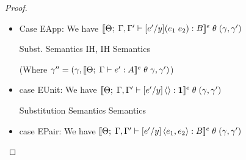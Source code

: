 \begin{proof}
\begin{itemize}
\begin{eqnproof}
          {IH}
          {Semantics}
  \end{eqnproof}

\item Case EApp: We have 
   $[\![{{\Theta};\;{\Gamma, \Gamma'} \vdash {[e'/y](e_1\;e_2)} : {B}}]\!]^e\;\theta\;
       (\gamma, \gamma')$

  \begin{eqnproof}
          {Subst.}
          {Semantics}
           {IH, IH}
           {Semantics}
  \end{eqnproof}

  (Where $\gamma'' = (\gamma, [\![{{\Theta};\;{\Gamma} \vdash {e'} : {A}}]\!]^e\;\theta\;\gamma, \gamma')$)

\item case EUnit: We have $[\![{{\Theta};\;{\Gamma, \Gamma'} \vdash {[e'/y]\left<\right>} : {\mathbf{1}}}]\!]^e\;\theta\;(\gamma, \gamma')$
  \begin{eqnproof}
         {Substitution}
   \eline{*}
         {Semantics}
         {Semantics}
  \end{eqnproof}


\item case EPair: We have $[\![{{\Theta};\;{\Gamma, \Gamma'} \vdash {[e'/y]\left<{e_1},{e_2}\right>} : {B}}]\!]^e\;\theta\;
       (\gamma, \gamma')$ 


\end{itemize}
\end{proof}
